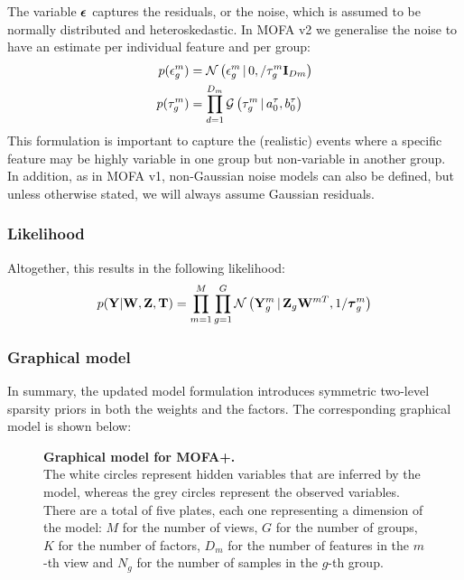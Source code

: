 The variable $\mbox{\boldmath $\epsilon$}$ captures the residuals, or the noise, which is assumed to be normally distributed and heteroskedastic. In MOFA v2 we generalise the noise to have an estimate per individual feature and per group:
\begin{align}
	p(\epsilon^{m}_{g}) &= \mathcal{N}\left(\epsilon^{m}_{g} \,|\, 0,/\tau^{m}_{g}{\bf I}_{Dm}\right) \\
	p(\tau^{m}_{g}) &= \prod_{d=1}^{D_m} \mathcal{G}\left(\tau^{m}_{g} \,|\, a_0^\tau, b_0^\tau\right)
\end{align}
This formulation is important to capture the (realistic) events where a specific feature may be highly variable in one group but non-variable in another group.\\
In addition, as in MOFA v1, non-Gaussian noise models can also be defined, but unless otherwise stated, we will always assume Gaussian residuals.

\subsubsection{Likelihood}

Altogether, this results in the following likelihood:
\begin{equation}
	p({\bf Y}|{\bf W},{\bf Z},\mbox{\boldmath $\mathrm{T}$}) = \prod_{m=1}^{M} \prod_{g=1}^{G} \mathcal{N}\left(\mathbf{Y}^{m}_{g} \,|\, \mathbf{Z}_{g} \mathbf{W}^{mT},1/\mbox{\boldmath $\tau$}^{m}_{g}\right)
\end{equation}

\subsubsection{Graphical model}

In summary, the updated model formulation introduces symmetric two-level sparsity priors in both the weights and the factors. The corresponding graphical model is shown below:
\begin{figure}[H]
	\centering	
	
	\caption{\textbf{Graphical model for MOFA+.}\\
	The white circles represent hidden variables that are inferred by the model, whereas the grey circles represent the observed variables. There are a total of five plates, each one representing a dimension of the model: $M$ for the number of views, $G$ for the number of groups, $K$ for the number of factors, $D_m$ for the number of features in the $m$-th view and $N_g$ for the number of samples in the $g$-th group.
	}
	\label{fig:MOFA2}
\end{figure}

